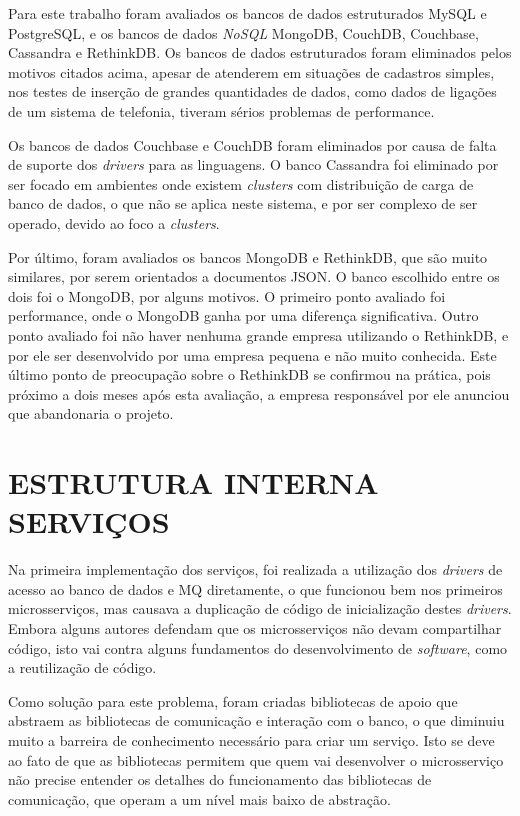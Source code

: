 Para este trabalho foram avaliados os bancos de dados estruturados MySQL e
PostgreSQL, e os bancos de dados \emph{NoSQL} MongoDB, CouchDB, Couchbase,
Cassandra e RethinkDB. Os bancos de dados estruturados foram eliminados
pelos motivos citados acima, apesar de atenderem em situações de cadastros
simples, nos testes de inserção de grandes quantidades de dados, como
dados de ligações de um sistema de telefonia, tiveram sérios problemas de
performance.

Os bancos de dados Couchbase e CouchDB foram eliminados por causa de falta
de suporte dos \emph{drivers} para as linguagens. O banco Cassandra foi
eliminado por ser focado em ambientes onde existem \emph{clusters}
com distribuição de carga de banco de dados, o que não se aplica neste
sistema, e por ser complexo de ser operado, devido ao foco a \emph{clusters}.

Por último, foram avaliados os bancos MongoDB e RethinkDB, que são muito
similares, por serem orientados a documentos \ac{JSON}. O banco escolhido
entre os dois foi o MongoDB, por alguns motivos. O primeiro ponto avaliado
foi performance, onde o MongoDB ganha por uma diferença significativa. Outro
ponto avaliado foi não haver nenhuma grande empresa utilizando o RethinkDB, e
por ele ser desenvolvido por uma empresa pequena e não muito conhecida.
Este último ponto de preocupação sobre o RethinkDB se confirmou na prática,
pois próximo a dois meses após esta avaliação, a empresa responsável por ele
anunciou que abandonaria o projeto.

\section{ESTRUTURA INTERNA SERVIÇOS}

Na primeira implementação dos serviços, foi realizada a utilização dos
\emph{drivers} de acesso ao banco de dados e \ac{MQ} diretamente, o que
funcionou bem nos primeiros microsserviços, mas causava a duplicação de código de
inicialização destes \emph{drivers}. Embora alguns autores defendam que
os microsserviços não devam compartilhar código, isto vai contra alguns
fundamentos do desenvolvimento de \emph{software}, como a reutilização de código.

Como solução para este problema, foram criadas bibliotecas de apoio que
abstraem as bibliotecas de comunicação e interação com o banco, o que
diminuiu muito a barreira de conhecimento necessário para criar um serviço.
Isto se deve ao fato de que as bibliotecas permitem que quem vai desenvolver
o microsserviço não precise entender os detalhes do funcionamento das
bibliotecas de comunicação, que operam a um nível mais baixo de abstração.


